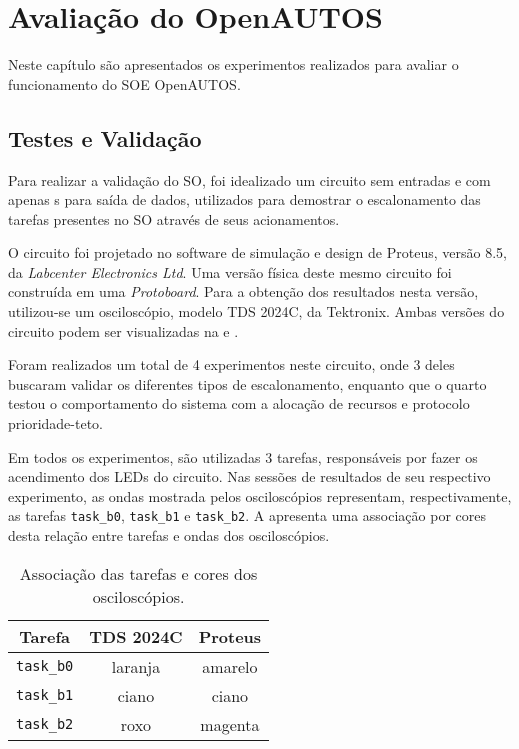 \chapter{Avaliação do OpenAUTOS}

Neste capítulo são apresentados os experimentos realizados para avaliar o funcionamento do SOE OpenAUTOS.

\section{Testes e Validação}

Para realizar a validação do SO, foi idealizado um circuito sem entradas e com apenas s para saída de dados, utilizados para demostrar o escalonamento das tarefas presentes no SO através de seus acionamentos.

O circuito foi projetado no software de simulação e design de  Proteus, versão 8.5, da \emph{Labcenter Electronics Ltd}. Uma versão física deste mesmo circuito foi construída em uma \emph{Protoboard}. Para a obtenção dos resultados nesta versão, utilizou-se um osciloscópio, modelo TDS 2024C, da Tektronix. Ambas versões do circuito podem ser visualizadas na  e .


Foram realizados um total de 4 experimentos neste circuito, onde 3 deles buscaram validar os diferentes tipos de escalonamento, enquanto que o quarto testou o comportamento do sistema com a alocação de recursos e protocolo prioridade-teto.

Em todos os experimentos, são utilizadas 3 tarefas, responsáveis por fazer os acendimento dos LEDs do circuito. Nas sessões de resultados de seu respectivo experimento, as ondas mostrada pelos osciloscópios representam, respectivamente, as tarefas \texttt{task\_b0}, \texttt{task\_b1} e \texttt{task\_b2}. A  apresenta uma associação por cores desta relação entre tarefas e ondas dos osciloscópios.

\begin{table}[h]
	\centering
	\caption{Associação das tarefas e cores dos osciloscópios.}
	\label{tab:cap5_osciloscope_color}
	\begin{tabular}{ccc}
		Tarefa            & TDS 2024C & Proteus \\ \hline \hline
		\texttt{task\_b0} & laranja   & amarelo \\ \hline
		\texttt{task\_b1} & ciano     & ciano   \\ \hline
		\texttt{task\_b2} & roxo      & magenta \\ \hline		
	\end{tabular}
\end{table}

